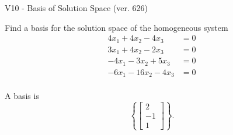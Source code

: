 \begin{exercise}
  \begin{exerciseTitle}V10 - Basis of Solution Space (ver. 626)\end{exerciseTitle}
  \begin{exerciseStatement}
    Find a basis for the solution space of the homogeneous system 
\begin{align*}
 4 x_ 1 + 4 x_ 2 -4 x_ 3 &= 0  \\ 
  3 x_ 1 + 4 x_ 2 -2 x_ 3 &= 0  \\ 
  -4 x_ 1 -3 x_ 2 + 5 x_ 3 &= 0  \\ 
  -6 x_ 1 -16 x_ 2 -4 x_ 3 &= 0  \\ 
 \end{align*}


 
  \end{exerciseStatement}

  \begin{exerciseAnswer}
   A basis is   
\[\left\{\left[\begin{array}{c}
2 \\
-1 \\
1
\end{array}\right]\right\}.\]

  


  \end{exerciseAnswer}
\end{exercise}